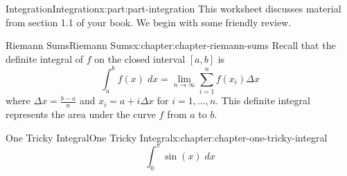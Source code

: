 \documentclass[oneside,10pt,]{book}
\begin{document}
\begin{partptx}{Integration}{}{Integration}{}{}{x:part:part-integration}
 This worksheet discusses material from section 1.1 of your book. We begin with some friendly review.%
%
\typeout{************************************************}
\typeout{************************************************}
%
\begin{chapterptx}{Riemann Sums}{}{Riemann Sums}{}{}{x:chapter:chapter-riemann-sums}
Recall that the definite integral of \(f\) on the closed interval \([a,b]\) is%
\begin{equation*}
\int_a^b f(x)\; dx = \lim_{n \to \infty} \sum_{i=1}^n f(x_i) \Delta x
\end{equation*}
where \(\Delta x = \frac{b-a}{n}\) and \(x_i = a + i \Delta x\) for \(i = 1, \dots, n\). This definite integral represents the area under the curve \(f\) from \(a\) to \(b\).%
\end{chapterptx}
%
\typeout{************************************************}
\typeout{************************************************}
%
\begin{chapterptx}{One Tricky Integral}{}{One Tricky Integral}{}{}{x:chapter:chapter-one-tricky-integral}
%
\begin{equation*}
\int_0^\pi \sin(x)\;dx
\end{equation*}
%
\end{chapterptx}
\end{partptx}
\end{document}
